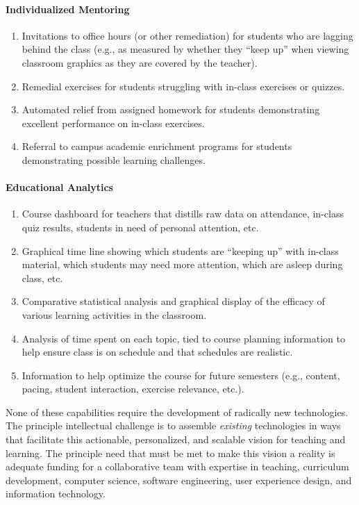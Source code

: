 \documentclass{article}
\begin{document}
\paragraph{Individualized Mentoring}
\begin{enumerate}
\item Invitations to office hours (or other remediation)
  for students who are lagging behind the class
  (e.g., as measured by whether they ``keep up''
  when viewing classroom graphics
  as they are covered by the teacher).
\item Remedial exercises for students
  struggling with in-class exercises or quizzes.
\item Automated relief from assigned homework for students demonstrating
  excellent performance on in-class exercises.
\item Referral to campus academic enrichment programs for students
  demonstrating possible learning challenges.
\end{enumerate}

\paragraph{Educational Analytics}
\begin{enumerate}
\item Course dashboard for teachers
  that distills raw data on attendance,
  in-class quiz results,
  students in need of personal attention, etc.
\item Graphical time line
  showing which students are ``keeping up''
  with in-class material,
  which students may need more attention,
  which are asleep during class, etc.
\item Comparative statistical analysis
  and graphical display
  of the efficacy of various learning activities
  in the classroom.
\item Analysis of time spent on each topic,
  tied to course planning information
  to help ensure class is on schedule
  and that schedules are realistic.
\item Information to help optimize the course
  for future semesters
  (e.g., content, pacing, student interaction, exercise relevance, etc.).
\end{enumerate}

None of these capabilities
require the development of radically new technologies.
The principle intellectual challenge
is to assemble \emph{existing} technologies
in ways that facilitate this actionable, personalized, and scalable vision
for teaching and learning.
The principle need that must be met to make this vision a reality
is adequate funding for a collaborative team with expertise in
teaching, curriculum development, computer science, software engineering,
user experience design, and information technology.
\end{document}
